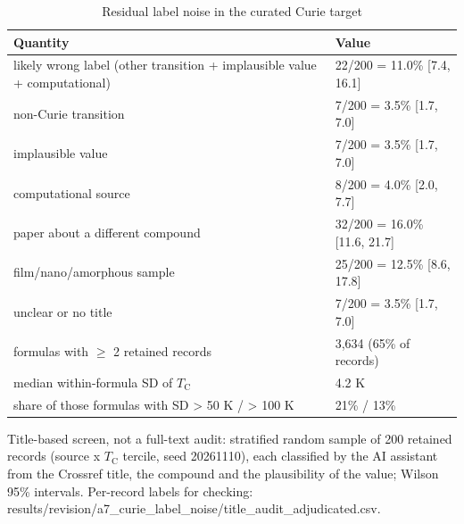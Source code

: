 \begin{table}
\caption{Residual label noise in the curated Curie target}
\label{tab:tableS5_curie_label_noise}
\tablefont
\begin{tabularx}{\textwidth}{@{}>{\raggedright\arraybackslash}Xl@{}}
\toprule
\textbf{Quantity} & \textbf{Value} \\
\midrule
likely wrong label (other transition + implausible value + computational) & 22/200 = 11.0\% [7.4, 16.1] \\
non-Curie transition & 7/200 = 3.5\% [1.7, 7.0] \\
implausible value & 7/200 = 3.5\% [1.7, 7.0] \\
computational source & 8/200 = 4.0\% [2.0, 7.7] \\
paper about a different compound & 32/200 = 16.0\% [11.6, 21.7] \\
film/nano/amorphous sample & 25/200 = 12.5\% [8.6, 17.8] \\
unclear or no title & 7/200 = 3.5\% [1.7, 7.0] \\
formulas with $\geq$ 2 retained records & 3,634 (65\% of records) \\
median within-formula SD of $T_\mathrm{C}$ & 4.2 K \\
share of those formulas with SD > 50 K / > 100 K & 21\% / 13\% \\
\bottomrule
\end{tabularx}
\par\vspace{4pt}\raggedright\noindent Title-based screen, not a full-text audit: stratified random sample of 200 retained records (source x $T_\mathrm{C}$ tercile, seed 20261110), each classified by the AI assistant from the Crossref title, the compound and the plausibility of the value; Wilson 95\% intervals. Per-record labels for checking: results/revision/a7\_curie\_label\_noise/title\_audit\_adjudicated.csv.
\end{table}

